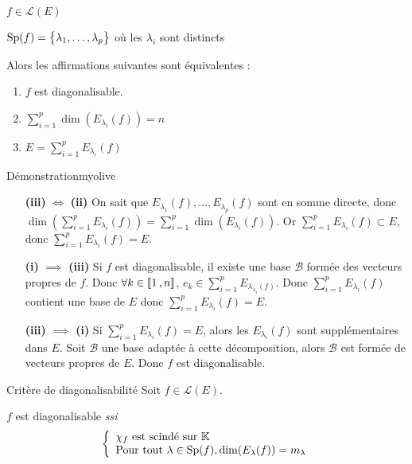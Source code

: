     \begin{prop}{}{}
        \begin{soient}
            \item $f \in \mathcal{L}(E)$
            \item $\operatorname{Sp}(f) = \big\{ \lambda_1,\ldots,\lambda_p \big\}$ où les $\lambda_i$ sont distincts
        \end{soient}
        Alors les affirmations suivantes sont équivalentes :
        \begin{enumerate}
            \item $f$ est diagonalisable.
            \item $\sum_{i=1}^{p} \dim(E_{\lambda_i}(f)) = n$
            \item $E = \sum_{i=1}^{p} E_{\lambda_i}(f)$
        \end{enumerate}
    \end{prop}

    \begin{demo}{Démonstration}{myolive}
        \begin{itemize}[leftmargin=2cm]
            \item[\textbf{(iii)} $\iff$ \textbf{(ii)}] On sait que $E_{\lambda_1}(f), \ldots, E_{\lambda_p}(f)$ sont en somme directe, donc $\dim\left(\sum_{i=1}^{p} E_{\lambda_i}(f)\right) = \sum_{i=1}^{p} \dim(E_{\lambda_i}(f))$. Or $\sum_{i=1}^{p} E_{\lambda_i}(f) \subset E$, donc $\sum_{i=1}^{p} E_{\lambda_i}(f) = E$.
            \item[\textbf{(i)} $\implies$ \textbf{(iii)}] Si $f$ est diagonalisable, il existe une base $\mathcal{B}$ formée des vecteurs propres de $f$. Donc $\forall k \in \left\llbracket 1 \, , n \right\rrbracket$, $e_k \in \sum_{i=1}^{p} E_{\lambda_{\lambda_i}(f)}$. Donc $\sum_{i=1}^{p} E_{\lambda_i}(f)$ contient une base de $E$ donc $\sum_{i=1}^{p} E_{\lambda_i}(f) = E$.
            \item[\textbf{(iii)} $\implies$ \textbf{(i)}] Si $\sum_{i=1}^{p} E_{\lambda_i}(f) = E$, alors les $E_{\lambda_i}(f)$ sont supplémentaires dans $E$. Soit $\mathcal{B}$ une base adaptée à cette décomposition, alors $\mathcal{B}$ est formée de vecteurs propres de $E$. Donc $f$ est diagonalisable. 
        \end{itemize}
    \end{demo}

    \begin{theo}{Critère de diagonalisabilité}{}
        Soit $f \in \mathcal{L}(E)$.

        $f$ est diagonalisable \textit{ssi} 
        \[ \et{\chi_f \text{ est scindé sur } \mathbb{K}}{\text{Pour tout } \lambda \in \Sp(f), \dim(E_{\lambda}(f)) = m_{\lambda}} \]
    \end{theo}

